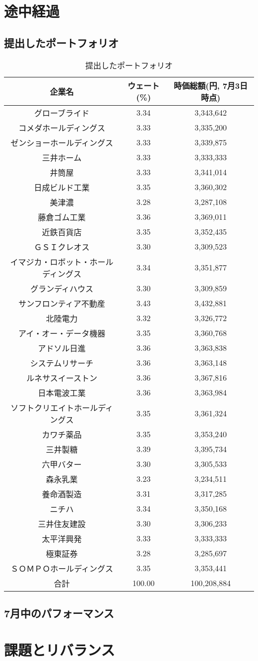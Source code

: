 \documentclass[11pt]{jreport}
\begin{document}
\chapter{途中経過}
\section{提出したポートフォリオ}

\begin{table}
\begin{center}
\begin{tabular}{|c|c|c|}
\hline
企業名 & ウェート(\%) & 時価総額(円, 7月3日時点)\\
\hline
\hline
グローブライド	&3.34&3,343,642\\
コメダホールディングス&3.33	&3,335,200\\
ゼンショーホールディングス&3.33&	3,339,875\\
三井ホーム&3.33&3,333,333\\
井筒屋&3.33	&3,341,014\\
日成ビルド工業&3.35&3,360,302\\
美津濃&3.28	&3,287,108\\
藤倉ゴム工業	&	3.36	&	3,369,011	\\
近鉄百貨店	&	3.35	&	3,352,435	\\
ＧＳＩクレオス	&	3.30	&	3,309,523	\\
イマジカ・ロボット・ホールディングス	&	3.34	&3,351,877\\
グランディハウス	&	3.30	&	3,309,859	\\
サンフロンティア不動産	&	3.43	&	3,432,881	\\
北陸電力	&	3.32	&	3,326,772	\\
アイ・オー・データ機器	&	3.35	&	3,360,768	\\
アドソル日進	&	3.36	&	3,363,838	\\
システムリサーチ	&	3.36	&	3,363,148	\\
ルネサスイーストン	&	3.36	&	3,367,816	\\
日本電波工業	&	3.36	&	3,363,984	\\
ソフトクリエイトホールディングス	&	3.35	&3,361,324\\
カワチ薬品	&	3.35	&	3,353,240	\\
三井製糖	&	3.39	&	3,395,734	\\
六甲バター	&	3.30	&	3,305,533	\\
森永乳業	&	3.23	&	3,234,511	\\
養命酒製造	&	3.31	&	3,317,285	\\
ニチハ	&	3.34	&	3,350,168	\\
三井住友建設	&	3.30	&	3,306,233	\\
太平洋興発	&	3.33	&	3,333,333	\\
極東証券	&	3.28	&	3,285,697	\\
ＳＯＭＰＯホールディングス	&	3.35	&	3,353,441\\
\hline
\hline
合計& 100.00 &  100,208,884\\
\hline
\end{tabular}
\end{center}
\caption{提出したポートフォリオ}
\label{tbl:port1}
\end{table}
\section{7月中のパフォーマンス}
\chapter{課題とリバランス}
\end{document}
